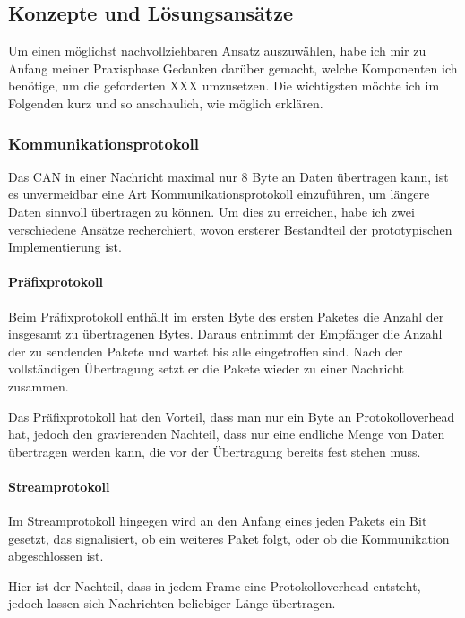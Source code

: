 \subsection{Konzepte und Lösungsansätze}

Um einen möglichst nachvollziehbaren Ansatz auszuwählen, habe ich mir zu Anfang meiner Praxisphase Gedanken darüber gemacht, welche Komponenten ich benötige, um die geforderten XXX umzusetzen. Die wichtigsten möchte ich im Folgenden kurz und so anschaulich, wie möglich erklären.

\subsubsection{Kommunikationsprotokoll}
Das CAN in einer Nachricht maximal nur 8 Byte an Daten übertragen kann, ist es unvermeidbar eine Art Kommunikationsprotokoll einzuführen, um längere Daten sinnvoll übertragen zu können. Um dies zu erreichen, habe ich zwei verschiedene Ansätze recherchiert, wovon ersterer Bestandteil der prototypischen Implementierung ist. 



\paragraph{Präfixprotokoll}
Beim Präfixprotokoll enthällt im ersten Byte des ersten Paketes die Anzahl der insgesamt zu übertragenen Bytes. Daraus entnimmt der Empfänger die Anzahl der zu sendenden Pakete und wartet bis alle eingetroffen sind. Nach der vollständigen Übertragung setzt er die Pakete wieder zu einer Nachricht zusammen.

Das Präfixprotokoll hat den Vorteil, dass man nur ein Byte an Protokolloverhead hat, jedoch den gravierenden Nachteil, dass nur eine endliche Menge von Daten übertragen werden kann, die vor der Übertragung bereits fest stehen muss. 
\paragraph{Streamprotokoll}
Im Streamprotokoll hingegen wird an den Anfang eines jeden Pakets ein Bit gesetzt, das signalisiert, ob ein weiteres Paket folgt, oder ob die Kommunikation abgeschlossen ist. 

Hier ist der Nachteil, dass in jedem Frame eine Protokolloverhead entsteht, jedoch lassen sich Nachrichten beliebiger Länge übertragen.


